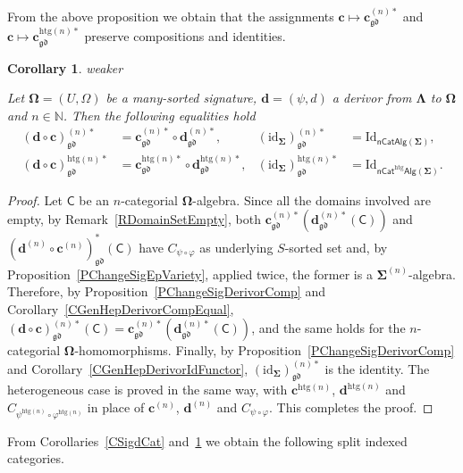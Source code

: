 \documentclass[a4paper, reqno]{amsbook}
\makeatletter
\newcommand{\sig}[1]{\mathbf{#1}}             %
\newcommand{\calg}[1]{\boldsymbol{\mathsf{#1}}} %
\newcommand{\gd}{\mathfrak{gd}}              %
\newcommand{\htg}{\mathrm{htg}}                %
\newcommand{\id}{\mathrm{id}}
\newcommand{\Id}{\mathrm{Id}}
\theoremstyle{plain}
\newtheorem{corollary}[theorem]{Corollary}
\theoremstyle{definition}
\newcommand*{\CA@leanpending}{}
\newcommand*{\CA@leanrelation}{}
\newcommand*{\lean}[2]{%
  \ifcsname\string\color@lean@#1\endcsname\else
    \PackageError{main}{Unknown relation `#1' in \string\lean}{Use equivalent, weaker or stronger.}%
  \fi
  \gdef\CA@leanrelation{#1}%
  \gdef\CA@leanpending{#2}}
\makeatother
\begin{document}
From the above proposition we obtain that the assignments $\mathbf{c}\mapsto\mathbf{c}^{(n)\ast}_{\gd}$ and $\mathbf{c}\mapsto\mathbf{c}^{\htg(n)\ast}_{\gd}$ preserve compositions and identities.

\begin{corollary}\label{CChangeSigFunctorComp}\lean{weaker}{ChangeOfSignature.homogeneousFunctorComp,ChangeOfSignature.homogeneousFunctorIdentity,ChangeOfSignature.heterogeneousFunctorComp,ChangeOfSignature.heterogeneousFunctorIdentity}
Let $\sig{\Omega}=(U,\Omega)$ be a many-sorted signature, $\mathbf{d}=(\psi,d)$ a derivor from $\sig{\Lambda}$ to $\sig{\Omega}$ and $n\in\mathbb{N}$.
Then the following equalities hold
\begin{align*}
(\mathbf{d}\circ\mathbf{c})^{(n)\ast}_{\gd}&=\mathbf{c}^{(n)\ast}_{\gd}\circ\mathbf{d}^{(n)\ast}_{\gd},
&
(\id_{\sig{\Sigma}})^{(n)\ast}_{\gd}&=\Id_{\mathsf{nCatAlg}(\sig{\Sigma})},
\\
(\mathbf{d}\circ\mathbf{c})^{\htg(n)\ast}_{\gd}&=\mathbf{c}^{\htg(n)\ast}_{\gd}\circ\mathbf{d}^{\htg(n)\ast}_{\gd},
&
(\id_{\sig{\Sigma}})^{\htg(n)\ast}_{\gd}&=\Id_{\mathsf{nCat}^{\htg}\mathsf{Alg}(\sig{\Sigma})}.
\end{align*}
\end{corollary}
\begin{proof}
Let $\calg{C}$ be an $n$-categorial $\sig{\Omega}$-algebra.
Since all the domains involved are empty, by Remark~\ref{RDomainSetEmpty}, both $\mathbf{c}^{(n)\ast}_{\gd}(\mathbf{d}^{(n)\ast}_{\gd}(\calg{C}))$ and $(\mathbf{d}^{(n)}\circ\mathbf{c}^{(n)})^{\ast}_{\gd}(\calg{C})$ have $C_{\psi\circ\varphi}$ as underlying $S$-sorted set and, by Proposition~\ref{PChangeSigEpVariety}, applied twice, the former is a $\sig{\Sigma}^{(n)}$-algebra.
Therefore, by Proposition~\ref{PChangeSigDerivorComp} and Corollary~\ref{CGenHepDerivorCompEqual}, $(\mathbf{d}\circ\mathbf{c})^{(n)\ast}_{\gd}(\calg{C})=\mathbf{c}^{(n)\ast}_{\gd}(\mathbf{d}^{(n)\ast}_{\gd}(\calg{C}))$, and the same holds for the $n$-categorial $\sig{\Omega}$-homomorphisms.
Finally, by Proposition~\ref{PChangeSigDerivorComp} and Corollary~\ref{CGenHepDerivorIdFunctor}, $(\id_{\sig{\Sigma}})^{(n)\ast}_{\gd}$ is the identity.
The heterogeneous case is proved in the same way, with $\mathbf{c}^{\htg(n)}$, $\mathbf{d}^{\htg(n)}$ and $C_{\psi^{\htg(n)}\circ\varphi^{\htg(n)}}$ in place of $\mathbf{c}^{(n)}$, $\mathbf{d}^{(n)}$ and $C_{\psi\circ\varphi}$. This completes the proof.
\end{proof}

From Corollaries~\ref{CSigdCat} and~\ref{CChangeSigFunctorComp} we obtain the following split indexed categories.
\end{document}
